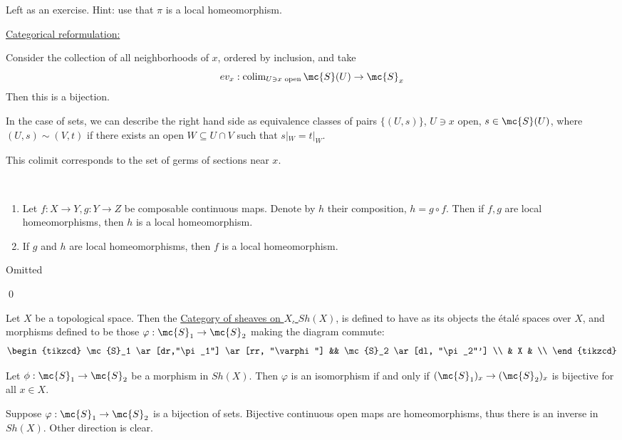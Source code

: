 \documentclass[x11names,reqno,14pt]{extarticle}
\begin{document}
\proof

Left as an exercise. Hint: use that $\pi$ is a local homeomorphism. 

\underline{Categorical reformulation:}

Consider the collection of all neighborhoods of $x$, ordered by inclusion, and take 
\[
ev_x: \operatorname{colim}_{U\ni x\text{ open}} \mc{S}(U) \to \mc{S}_x
\]
Then this is a bijection.

In the case of sets, we can describe the right hand side as equivalence classes of pairs $\{(U,s)\}$, $U\ni x$ open, $s\in \mc{S}(U)$, where $(U,s) \sim (V,t)$ if there exists an open $W \subseteq U\cap V$ such that $s|_W = t|_W$.

This colimit corresponds to the set of germs of sections near $x$.

\lem
\,
\begin{enumerate}

\item Let $f:X\to Y, g:Y\to Z$ be composable continuous maps. Denote by $h$ their composition, $h = g\circ f$. Then if $f, g$ are local homeomorphisms, then $h$ is a local homeomorphism. 

\item If $g$ and $h$ are local homeomorphisms, then $f$ is a local homeomorphism.

\end{enumerate}

\proof

Omitted

\qed


Let $X$ be a topological space. Then the \underline{Category of sheaves on $X$, $Sh(X)$}, is defined to have as its objects the \'etal\'e spaces over $X$, and morphisms defined to be those $\varphi:\mc{S}_1\to\mc{S}_2$ making the diagram commute:
\[
\begin{tikzcd}
\mc{S}_1 \ar[dr,"\pi_1"] \ar[rr, "\varphi"] && \mc{S}_2 \ar[dl, "\pi_2"']  \\
& X & \\
\end{tikzcd}
\]


Let $\phi:\mc{S}_1\to\mc{S}_2$ be a morphism in $Sh(X)$. Then $\varphi$ is an isomorphism if and only if $(\mc{S}_1)_x\to(\mc{S}_2)_x$ is bijective for all $x \in X$. 

\proof

Suppose $\varphi:\mc{S}_1\to\mc{S}_2$ is a bijection of sets. Bijective continuous open maps are homeomorphisms, thus there is an inverse in $Sh(X)$. Other direction is clear. 
\end{document}
